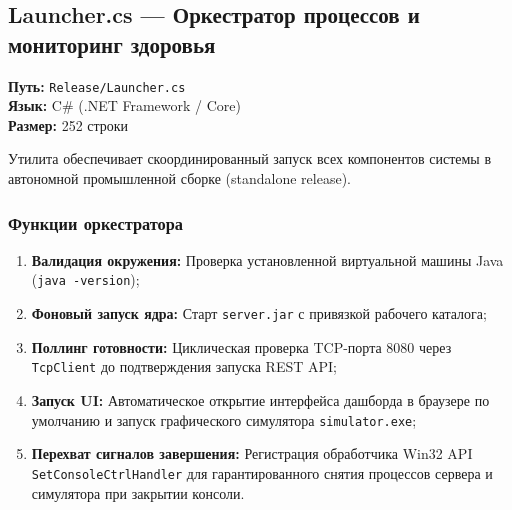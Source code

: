 \documentclass[14pt, a4paper]{extarticle}
\begin{document}
\subsection{Launcher.cs --- Оркестратор процессов и мониторинг здоровья}

\textbf{Путь:} \texttt{Release/Launcher.cs}\\
\textbf{Язык:} C\# (.NET Framework / Core)\\
\textbf{Размер:} 252 строки

Утилита обеспечивает скоординированный запуск всех компонентов системы в автономной промышленной сборке (standalone release).

\subsubsection{Функции оркестратора}
\begin{enumerate}
    \item \textbf{Валидация окружения:} Проверка установленной виртуальной машины Java (\texttt{java -version});
    \item \textbf{Фоновый запуск ядра:} Старт \texttt{server.jar} с привязкой рабочего каталога;
    \item \textbf{Поллинг готовности:} Циклическая проверка TCP-порта 8080 через \texttt{TcpClient} до подтверждения запуска REST API;
    \item \textbf{Запуск UI:} Автоматическое открытие интерфейса дашборда в браузере по умолчанию и запуск графического симулятора \texttt{simulator.exe};
    \item \textbf{Перехват сигналов завершения:} Регистрация обработчика Win32 API \texttt{SetConsoleCtrlHandler} для гарантированного снятия процессов сервера и симулятора при закрытии консоли.
\end{enumerate}
\end{document}
